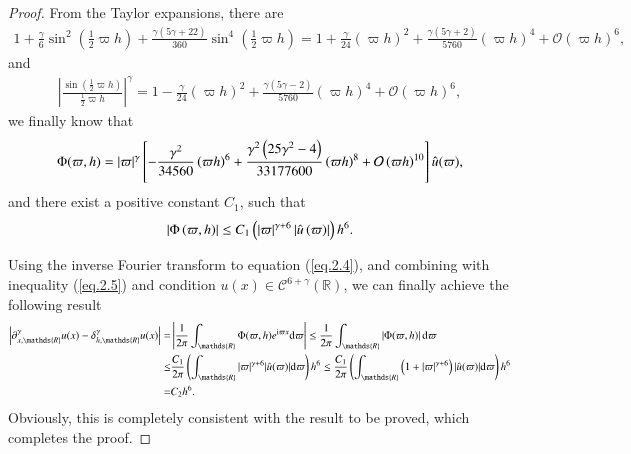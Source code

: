 \documentclass{siamart171218}
\numberwithin{theorem}{section}
\numberwithin{equation}{section}
\begin{document}
\begin{proof}
From the Taylor expansions, there are
\begin{equation*}
\begin{aligned}\displaystyle
1+\frac{\gamma}{6}\sin^2\left(\frac{1}{2}\varpi h\right)
 +\frac{\gamma(5\gamma+22)}{360}\sin^4\left(\frac{1}{2}\varpi h\right)
 =1+\frac{\gamma}{24}\left(\varpi h\right)^2+\frac{\gamma(5\gamma+2)}{5760}
 \left(\varpi h\right)^4+\mathcal{O}\left(\varpi h\right)^6,
\end{aligned}
\end{equation*}
and
\begin{equation*}
\begin{aligned}\displaystyle
 \left|\frac{\sin\left(\frac{1}{2}\varpi h\right)}{\frac{1}{2}\varpi h}\right|^\gamma
 =1-\frac{\gamma}{24}\left(\varpi h\right)^2+\frac{\gamma(5\gamma-2)}{5760}
 \left(\varpi h\right)^4+\mathcal{O}\left(\varpi h\right)^6,
\end{aligned}
\end{equation*}
we finally know that
\begin{equation*}
\begin{aligned}\displaystyle
\displaystyle \Phi(\varpi,h)=|\varpi|^\gamma\left[-\frac{\gamma^2}{34560}
\left(\varpi h\right)^6
+\frac{\gamma^2\left(25\gamma^2-4\right)}{33177600}\left(\varpi h\right)^8
+\mathcal{O}\left(\varpi h\right)^{10}
\right]\hat{u}(\varpi),
\end{aligned}
\end{equation*}
and there exist a positive constant $C_1$, such that
\begin{equation}\label{eq.2.5}
\begin{aligned}\displaystyle
\displaystyle \left|\Phi\left(\varpi,h\right)\right|
\leq C_1\left(\left|\varpi\right|^{\gamma+6}\left|\hat{u}\left(\varpi\right)\right|\right)h^{6}.
\end{aligned}
\end{equation}

Using the inverse Fourier transform to equation (\ref{eq.2.4}), and
combining with inequality (\ref{eq.2.5})
 and condition $u(x)\in \mathscr{C}^{6+\gamma}(\mathds{{R}})$,
 we can finally achieve the following result
\begin{equation*}
\begin{aligned}
\displaystyle \left|
\partial_{x,\mathds{R}}^\gamma u(x)-
{\delta}_{h,\mathds{R}}^{\gamma}u(x)\right|
=&\displaystyle\left|\frac{1}{2\pi}\int_{{\mathds{R}}}\Phi(\varpi,h)
e^{\mathrm{i}\varpi x}\mathrm{d}\varpi\right|\leq
\frac{1}{2\pi}\int_{{\mathds{R}}}\left|\Phi(\varpi,h)\right|
\mathrm{d}\varpi\vspace{0.1 cm}\\
 \leq
&\displaystyle\frac{C_1}{2\pi}\left(\int_{{\mathds{R}}}|\varpi|^{\gamma+6}|\hat{u}(\varpi)|
\mathrm{d}\varpi\right)h^{6}
\leq \frac{C_1}{2\pi}\left(\int_{{\mathds{R}}}\left(1+|\varpi|^{\gamma+6}\right)|\hat{u}(\varpi)|
\mathrm{d}\varpi\right)h^{6}\\
=&\displaystyle C_2h^6.
\end{aligned}
\end{equation*}
Obviously, this is completely consistent with the result to be proved, which completes the proof.
\end{proof}
\end{document}
